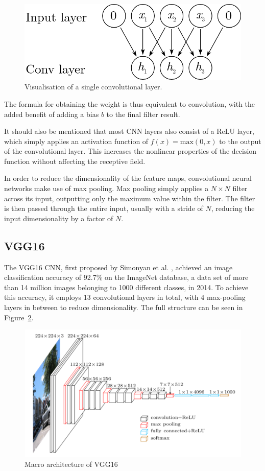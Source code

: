 \begin{figure}[ht]
    \centering
    \includegraphics[width=0.5\linewidth]{content/fig/cnn_layer.png}
    \caption{Visualisation of a single convolutional layer.}
    \label{fig:cnn_layer}
\end{figure}

The formula for obtaining the weight is thus equivalent to convolution, with the added benefit of adding a bias $b$ to the final filter result. 

It should also be mentioned that most CNN layers also consist of a ReLU layer, which simply applies an activation function of $f(x)=\mathrm{max}(0,x)$ to the output of the convolutional layer. 
This increases the nonlinear properties of the decision function without affecting the receptive field.\cite{pmlr-v15-glorot11a}

In order to reduce the dimensionality of the feature maps, convolutional neural networks make use of max pooling.
Max pooling simply applies a $N \times N$ filter across its input, outputting only the maximum value within the filter.
The filter is then passed through the entire input, usually with a stride of $N$, reducing the input dimensionality by a factor of $N$.

\subsection{VGG16}

The VGG16 CNN, first proposed by Simonyan et al. \cite{DBLP:journals/corr/SimonyanZ14a}, achieved an image classification accuracy of 92.7\% on the ImageNet database, a data set of more than 14 million images belonging to 1000 different classes, in 2014\cite{ILSVRC15}.
To achieve this accuracy, it employs 13 convolutional layers in total, with 4 max-pooling layers in between to reduce dimensionality.
The full structure can be seen in Figure~\ref{fig:vgg16}.

\begin{figure}[h]
    \centering
    \includegraphics[width=0.6\linewidth]{content/fig/vgg16.png}
    \caption{Macro architecture of VGG16}
    \label{fig:vgg16}
\end{figure}

